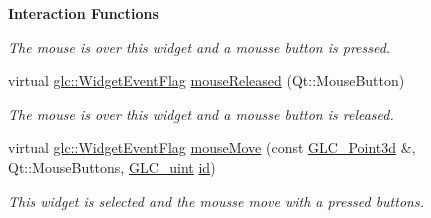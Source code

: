 \begin{Indent}{\bf Interaction Functions}
\begin{DoxyCompactItemize}
\begin{DoxyCompactList}\small\item\em The mouse is over this widget and a mousse button is pressed. \end{DoxyCompactList}\item 
virtual \hyperlink{namespaceglc_a7a4a1e3955352aeb2d018746fbe626d5}{glc\-::\-Widget\-Event\-Flag} \hyperlink{class_g_l_c__3_d_widget_a8ad4d9f85d78d42c396283175da1b1ca}{mouse\-Released} (Qt\-::\-Mouse\-Button)
\begin{DoxyCompactList}\small\item\em The mouse is over this widget and a mousse button is released. \end{DoxyCompactList}\item 
virtual \hyperlink{namespaceglc_a7a4a1e3955352aeb2d018746fbe626d5}{glc\-::\-Widget\-Event\-Flag} \hyperlink{class_g_l_c__3_d_widget_a28d8301332236a7637fd745ac43f0a2a}{mouse\-Move} (const \hyperlink{glc__vector3d_8h_a4e13a9bbc7ab3d34de7e98b41836772c}{G\-L\-C\-\_\-\-Point3d} \&, Qt\-::\-Mouse\-Buttons, \hyperlink{glc__global_8h_abf950976fabed69026558df8e2da6c6b}{G\-L\-C\-\_\-uint} \hyperlink{glext_8h_a58c2a664503e14ffb8f21012aabff3e9}{id})
\begin{DoxyCompactList}\small\item\em This widget is selected and the mousse move with a pressed buttons. \end{DoxyCompactList}\end{DoxyCompactItemize}
\end{Indent}
